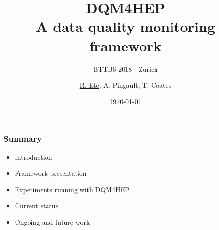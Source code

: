 \documentclass[presentation, 10pt]{beamer}
\title{DQM4HEP \\ A data quality monitoring framework}
\subtitle{BTTB6 2018 - Zurich}
\author[R. Ete]{\underline{R. Ete}, A. Pingault, T. Coates}
\institute{DESY}
\date{\today}
\begin{document}
\maketitle

\begin{frame}
  \frametitle{Summary}

  \begin{itemize}
    \item Introduction
    \item Framework presentation
    \item Experiments running with DQM4HEP
    \item Current status
    \item Ongoing and future work
  \end{itemize}
  
\end{frame}

\end{document}
